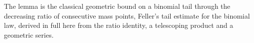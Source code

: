 
The lemma is the classical geometric bound on a binomial tail through the
decreasing ratio of consecutive mass points, Feller's tail estimate for the
binomial law, derived in full here from the ratio identity, a telescoping
product and a geometric series.

